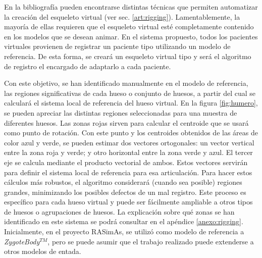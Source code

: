 En la bibliografía pueden encontrarse distintas técnicas que permiten automatizar la creación del esqueleto virtual (ver sec. \ref{art:rigging}). Lamentablemente, la mayoría de ellas requieren que el esqueleto virtual esté completamente contenido en los modelos que se desean animar. En el sistema propuesto, todos los pacientes virtuales provienen de registrar un paciente tipo utilizando un modelo de referencia.  De esta forma, se creará un esqueleto virtual tipo y será el algoritmo de registro el encargado de adaptarlo a cada paciente.  %

Con este objetivo, se han identificado manualmente en el modelo de referencia, las regiones significativas de cada hueso o conjunto de huesos, a partir del cual se calculará el sistema local de referencia del hueso virtual. En la figura \ref{fig:humero}, se pueden apreciar las distintas regiones seleccionadas para una muestra de diferentes huesos. 
Las zonas rojas sirven para calcular el centroide que se usará como punto de rotación. Con este punto y los centroides obtenidos de las áreas de color azul y verde, se pueden estimar dos vectores ortogonales: un vector vertical entre la zona roja y verde; y otro horizontal entre la zona verde y azul. El tercer eje se calcula mediante el producto vectorial de ambos. Estos vectores servirán para definir el sistema local de referencia para esa articulación. Para hacer estos cálculos más robustos, el algoritmo considerará (cuando sea posible) regiones grandes, minimizando los posibles defectos de un mal registro. Este proceso es específico para cada hueso virtual y puede ser fácilmente ampliable a otros tipos de huesos o agrupaciones de huesos. La explicación sobre qué zonas se han identificado en este sistema se podrá consultar en el apéndice \ref{anexo:rigging}. 
%
Inicialmente, en el proyecto \ac{RASimAs}, se utilizó como modelo de referencia a  \emph{ZygoteBody}$^{TM}$, pero se puede asumir que el trabajo realizado puede extenderse a otros modelos de entada.


